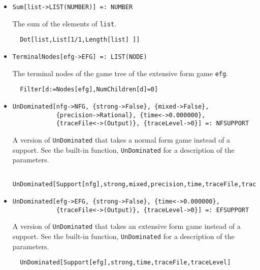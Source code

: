 \begin{itemize}
\item{}
\protect \large \begin{verbatim}
Sum[list->LIST(NUMBER)] =: NUMBER 
\end{verbatim}\normalsize

\bd 
The sum of the elements of \verb+list+.  
\begin{verbatim}
  Dot[list,List[1/1,Length[list] ]]
\end{verbatim} 
\ed



\item{}
\protect \large \begin{verbatim}
TerminalNodes[efg->EFG] =: LIST(NODE) 
\end{verbatim}\normalsize

\bd 
The terminal nodes of the game tree of the extensive form game \verb+efg+.
\begin{verbatim}
  Filter[d:=Nodes[efg],NumChildren[d]=0]
\end{verbatim} 
\ed


\item{}
\protect \large \begin{verbatim}
UnDominated[nfg->NFG, {strong->False}, {mixed->False}, 
            {precision->Rational}, {time<->0.000000}, 
            {traceFile<->(Output)}, {traceLevel->0}] =: NFSUPPORT 
\end{verbatim}\normalsize

\bd 
A version of \verb+UnDominated+ that takes a normal form game instead
of a support.  See the built-in function, \verb+UnDominated+ for a
description of the parameters.
\begin{verbatim}
  UnDominated[Support[nfg],strong,mixed,precision,time,traceFile,traceLevel]
\end{verbatim} 
\ed

\item{}
\protect \large \begin{verbatim}
UnDominated[efg->EFG, {strong->False}, {time<->0.000000}, 
            {traceFile<->(Output)}, {traceLevel->0}] =: EFSUPPORT 
\end{verbatim}\normalsize

\bd 
A version of \verb+UnDominated+ that takes an extensive form game instead
of a support.  See the built-in function, \verb+UnDominated+ for a
description of the parameters.
\begin{verbatim}
  UnDominated[Support[efg],strong,time,traceFile,traceLevel]
\end{verbatim} 
\ed


\end{itemize}
